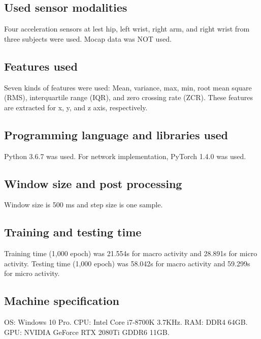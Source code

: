 \documentclass{svmult}
\begin{document}
\subsection*{Used sensor modalities}
Four acceleration sensors at lest hip, left wrist, right arm, and right wrist from three subjects were used. Mocap data was NOT used.

\subsection*{Features used}
Seven kinds of features were used: Mean, variance, max, min, root mean square (RMS), interquartile range (IQR), and zero crossing rate (ZCR).
These features are extracted for x, y, and z axis, respectively.

\subsection*{Programming language and libraries used}
Python 3.6.7 was used. For network implementation, PyTorch 1.4.0 was used.

\subsection*{Window size and post processing}
Window size is 500 ms and step size is one sample.

\subsection*{Training and testing time}
Training time (1,000 epoch) was 21.554s for macro activity and 28.891s for micro activity.
Testing time (1,000 epoch) was 58.042s for macro activity and 59.299s for micro activity.

\subsection*{Machine specification}
OS: Windows 10 Pro. CPU: Intel Core i7-8700K 3.7KHz. RAM: DDR4 64GB. GPU: NVIDIA GeForce RTX 2080Ti GDDR6 11GB.

%
\end{document}

